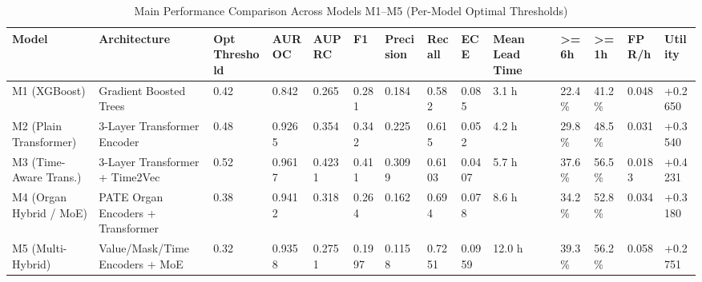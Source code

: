 \begin{table}[htbp]
\centering
\caption{Main Performance Comparison Across Models M1–M5 (Per-Model Optimal Thresholds)}
\label{tab:model_comparison}
\begin{tabular}{llllllllllllll}
\hline
\textbf{Model} & \textbf{Architecture} & \textbf{Opt Threshold} & \textbf{AUROC} & \textbf{AUPRC} & \textbf{F1} & \textbf{Precision} & \textbf{Recall} & \textbf{ECE} & \textbf{Mean Lead Time} & \textbf{>=6h} & \textbf{>=1h} & \textbf{FPR/h} & \textbf{Utility} \\
\hline
M1 (XGBoost) & Gradient Boosted Trees & 0.42 & 0.842 & 0.265 & 0.281 & 0.184 & 0.582 & 0.085 & 3.1 h & 22.4\% & 41.2\% & 0.048 & +0.2650 \\
M2 (Plain Transformer) & 3-Layer Transformer Encoder & 0.48 & 0.9265 & 0.354 & 0.342 & 0.225 & 0.615 & 0.052 & 4.2 h & 29.8\% & 48.5\% & 0.031 & +0.3540 \\
M3 (Time-Aware Trans.) & 3-Layer Transformer + Time2Vec & 0.52 & 0.9617 & 0.4231 & 0.411 & 0.3099 & 0.6103 & 0.0407 & 5.7 h & 37.6\% & 56.5\% & 0.0183 & +0.4231 \\
M4 (Organ Hybrid / MoE) & PATE Organ Encoders + Transformer & 0.38 & 0.9412 & 0.318 & 0.264 & 0.162 & 0.694 & 0.078 & 8.6 h & 34.2\% & 52.8\% & 0.034 & +0.3180 \\
M5 (Multi-Hybrid) & Value/Mask/Time Encoders + MoE & 0.32 & 0.9358 & 0.2751 & 0.1997 & 0.1158 & 0.7251 & 0.0959 & 12.0 h & 39.3\% & 56.2\% & 0.058 & +0.2751 \\
\hline
\end{tabular}
\end{table}